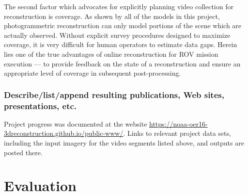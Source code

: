 \documentclass[letterpaper,12pt]{article}
\begin{document}
The second factor which advocates for explicitly planning video collection for reconstruction is coverage.  As shown by all of the models in this project, photogrammetric reconstruction can only model portions of the scene which are actually observed.   Without explicit survey procedures designed to maximize coverage, it is very difficult for human operators to estimate data gaps.  Herein lies one of the true advantages of online reconstruction for ROV mission execution --- to provide feedback on the state of a reconstruction and ensure an appropriate level of coverage in subsequent post-processing.



\subsubsection*{Describe/list/append resulting publications, Web sites, presentations, etc.}

Project progress was documented at the website \url{https://noaa-oer16-3dreconstruction.github.io/public-www/}.    Links to relevant project data sets, including the input imagery for the video segments listed above, and outputs are posted there.



\section{Evaluation}
\end{document}
